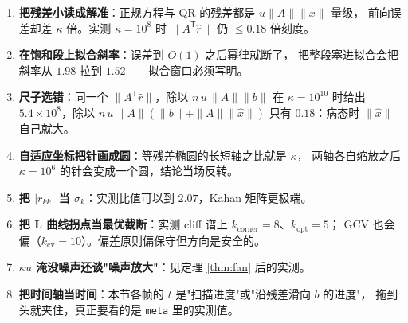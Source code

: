 \begin{enumerate}
  \item \textbf{把残差小读成解准}：正规方程与 QR 的残差都是 $u\|A\|\|x\|$ 量级，
        前向误差却差 $\kappa$ 倍。实测 $\kappa=10^{8}$ 时 $\|A^{\mathsf T}\hat r\|$ 仍 $\le0.18$ 倍刻度。
  \item \textbf{在饱和段上拟合斜率}：误差到 $O(1)$ 之后幂律就断了，
        把整段塞进拟合会把斜率从 $1.98$ 拉到 $1.52$——拟合窗口必须写明。
  \item \textbf{尺子选错}：同一个 $\|A^{\mathsf T}\hat r\|$，除以 $n\,u\,\|A\|\|b\|$
        在 $\kappa=10^{10}$ 时给出 $5.4\times10^{8}$，除以
        $n\,u\,\|A\|(\|b\|+\|A\|\|\hat x\|)$ 只有 $0.18$：病态时 $\|\hat x\|$ 自己就大。
  \item \textbf{自适应坐标把针画成圆}：等残差椭圆的长短轴之比就是 $\kappa$，
        两轴各自缩放之后 $\kappa=10^{6}$ 的针会变成一个圆，结论当场反转。
  \item \textbf{把 $|r_{kk}|$ 当 $\sigma_k$}：实测比值可以到 $2.07$，Kahan 矩阵更极端。
  \item \textbf{把 L 曲线拐点当最优截断}：实测 cliff 谱上 $k_{\text{corner}}=8$、$k_{\text{opt}}=5$；
        GCV 也会偏（$k_{\text{cv}}=10$）。偏差原则偏保守但方向是安全的。
  \item \textbf{$\kappa u$ 淹没噪声还谈"噪声放大"}：见定理 \ref{thm:fan} 后的实测。
  \item \textbf{把时间轴当时间}：本节各帧的 $t$ 是"扫描进度"或"沿残差滑向 $b$ 的进度"，
        拖到头就夹住，真正要看的是 \texttt{meta} 里的实测值。
\end{enumerate}


